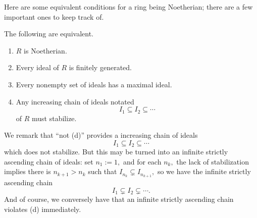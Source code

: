 \documentclass[../notes.tex]{subfiles}
\begin{document}
Here are some equivalent conditions for a ring being Noetherian; there are a few important ones to keep track of.
\begin{proposition}
	The following are equivalent.
	\begin{enumerate}[label=(\alph*)]
		\item $R$ is Noetherian.
		\item Every ideal of $R$ is finitely generated.
		\item Every nonempty set of ideals has a maximal ideal.
		\item Any increasing chain of ideals notated
		\[I_1\subseteq I_2\subseteq\cdots\]
		of $R$ must stabilize.
	\end{enumerate}
\end{proposition}
We remark that ``not (d)'' provides a increasing chain of ideals
\[I_1\subseteq I_2\subseteq\cdots\]
which does not stabilize. But this may be turned into an infinite strictly ascending chain of ideals: set $n_1:=1,$ and for each $n_k,$ the lack of stabilization implies there is $n_{k+1}>n_k$ such that $I_{n_k}\subsetneq I_{n_{k+1}},$ so we have the infinite strictly ascending chain
\[I_1\subsetneq I_2\subsetneq\cdots.\]
And of course, we conversely have that an infinite strictly ascending chain violates (d) immediately.
\end{document}
